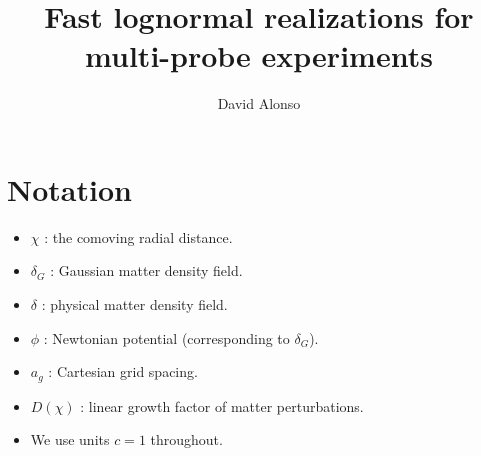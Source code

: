 \documentclass[a4paper,10pt]{article}
\title{Fast lognormal realizations for multi-probe experiments}
\author{David Alonso}
\begin{document}
\maketitle

\section{Notation}
  \begin{itemize}
    \item $\chi$     : the comoving radial distance.
    \item $\delta_G$ : Gaussian matter density field.
    \item $\delta$   : physical matter density field.
    \item $\phi$     : Newtonian potential (corresponding to $\delta_G$).
    \item $a_g$      : Cartesian grid spacing.
    \item $D(\chi)$  : linear growth factor of matter perturbations.
    \item We use units $c=1$ throughout.
  \end{itemize}
\end{document}
